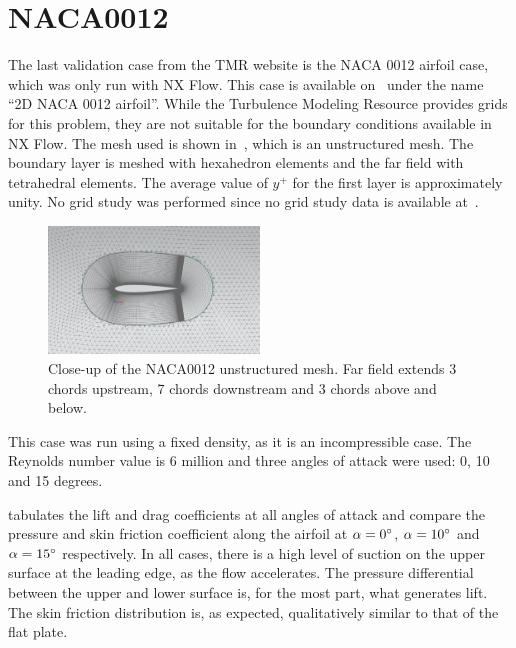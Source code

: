 \section{NACA0012}
The last validation case from the TMR website is the NACA 0012 airfoil case, which was only run with NX Flow. This case is available on~\cite{tmr} under the name ``2D NACA 0012 airfoil''. While the Turbulence Modeling Resource provides grids for this problem, they are not suitable for the boundary conditions available in NX Flow. The mesh used is shown in~, which is an unstructured mesh. The boundary layer is meshed with hexahedron elements and the far field with tetrahedral elements. The average value of $y^+$ for the first layer is approximately unity. No grid study was performed since no grid study data is available at~\cite{tmr}.
\begin{figure}
    \centering
    \includegraphics[width=0.5\textwidth]{figs/naca0012/naca0012.png}
    \caption{Close-up of the NACA0012 unstructured mesh. Far field extends 3 chords upstream, 7 chords downstream and 3 chords above and below.}
    \label{fig:naca0012}
\end{figure}
This case was run using a fixed density, as it is an incompressible case. The Reynolds number value is 6 million and three angles of attack were used: 0, 10 and 15 degrees.

 tabulates the lift and drag coefficients at all angles of attack and  compare the pressure and skin friction coefficient along the airfoil at $\alpha=0^\circ$, $\alpha=10^\circ$ and $\alpha=15^\circ$ respectively. In all cases, there is a high level of suction on the upper surface at the leading edge, as the flow accelerates. The pressure differential between the upper and lower surface is, for the most part, what generates lift. The skin friction distribution is, as expected, qualitatively similar to that of the flat plate. 

